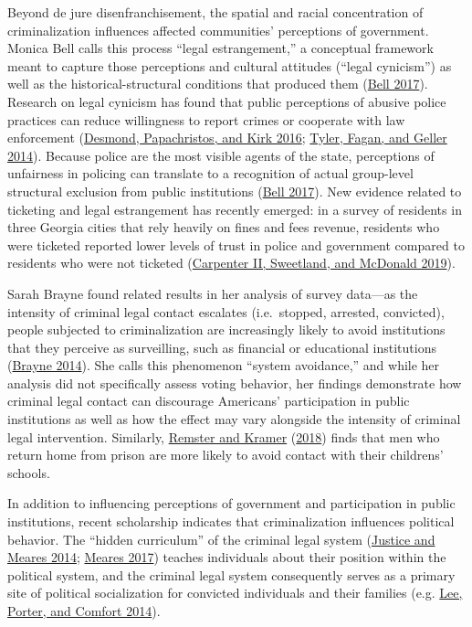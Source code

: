 \documentclass[
  12pt,
]{article}
\begin{document}
Beyond de jure disenfranchisement, the spatial and racial concentration of criminalization influences affected communities' perceptions of government. Monica Bell calls this process ``legal estrangement,'' a conceptual framework meant to capture those perceptions and cultural attitudes (``legal cynicism'') as well as the historical-structural conditions that produced them (\protect\hyperlink{ref-Bell2017}{Bell 2017}). Research on legal cynicism has found that public perceptions of abusive police practices can reduce willingness to report crimes or cooperate with law enforcement (\protect\hyperlink{ref-Desmond2016}{Desmond, Papachristos, and Kirk 2016}; \protect\hyperlink{ref-Tyler2014}{Tyler, Fagan, and Geller 2014}). Because police are the most visible agents of the state, perceptions of unfairness in policing can translate to a recognition of actual group-level structural exclusion from public institutions (\protect\hyperlink{ref-Bell2017}{Bell 2017}). New evidence related to ticketing and legal estrangement has recently emerged: in a survey of residents in three Georgia cities that rely heavily on fines and fees revenue, residents who were ticketed reported lower levels of trust in police and government compared to residents who were not ticketed (\protect\hyperlink{ref-CarpenterII2019}{Carpenter II, Sweetland, and McDonald 2019}).

Sarah Brayne found related results in her analysis of survey data---as the intensity of criminal legal contact escalates (i.e.~stopped, arrested, convicted), people subjected to criminalization are increasingly likely to avoid institutions that they perceive as surveilling, such as financial or educational institutions (\protect\hyperlink{ref-Brayne2014}{Brayne 2014}). She calls this phenomenon ``system avoidance,'' and while her analysis did not specifically assess voting behavior, her findings demonstrate how criminal legal contact can discourage Americans' participation in public institutions as well as how the effect may vary alongside the intensity of criminal legal intervention. Similarly, \protect\hyperlink{ref-Remster2018a}{Remster and Kramer} (\protect\hyperlink{ref-Remster2018a}{2018}) finds that men who return home from prison are more likely to avoid contact with their childrens' schools.

In addition to influencing perceptions of government and participation in public institutions, recent scholarship indicates that criminalization influences political behavior. The ``hidden curriculum'' of the criminal legal system (\protect\hyperlink{ref-Justice2014}{Justice and Meares 2014}; \protect\hyperlink{ref-Meares2017}{Meares 2017}) teaches individuals about their position within the political system, and the criminal legal system consequently serves as a primary site of political socialization for convicted individuals and their families (e.g. \protect\hyperlink{ref-Lee2014}{Lee, Porter, and Comfort 2014}).
\end{document}
